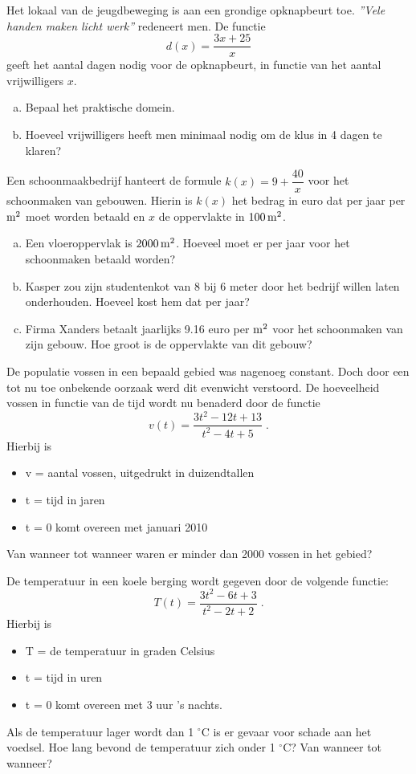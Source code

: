 \documentclass[a4paper,12pt]{article}
\begin{document}
\begin{oefening}
Het lokaal van de jeugdbeweging is aan een grondige opknapbeurt toe. {\em ''Vele handen maken licht werk''} redeneert men. De functie
$$d(x)=\dfrac{3x+25}{x}$$
geeft het aantal dagen nodig voor de opknapbeurt, in functie van het aantal vrijwilligers $x$.
\begin{enumerate}[(a)]
  \item Bepaal het praktische domein.
  \item Hoeveel vrijwilligers heeft men minimaal nodig om de klus in 4 dagen te klaren?
\end{enumerate}
\end{oefening}

\begin{oefening}
Een schoonmaakbedrijf hanteert de formule $k(x)=9+\dfrac{40}{x}$ voor het schoonmaken van gebouwen. Hierin is $k(x)$ het bedrag in euro dat per jaar per $\m^2$ moet worden betaald en $x$ de oppervlakte in $100 \m^2$.
\begin{enumerate}[(a)]
  \item Een vloeroppervlak is $2000 \m^2$. Hoeveel moet er per jaar voor het schoonmaken betaald worden?
  \item Kasper zou zijn studentenkot van 8 bij 6 meter door het bedrijf willen laten onderhouden. Hoeveel kost hem dat per jaar?
  \item Firma Xanders betaalt jaarlijks 9.16 euro per $\m^2$ voor het schoonmaken van zijn gebouw. Hoe groot is de oppervlakte van dit gebouw?
\end{enumerate}
\end{oefening}

\begin{oefening}
De populatie vossen in een bepaald gebied was nagenoeg constant. Doch door een tot nu toe onbekende oorzaak werd dit evenwicht verstoord. De hoeveelheid vossen in functie van de tijd wordt nu benaderd door de functie
$$v(t)=\dfrac{3t^2-12t+13}{t^2-4t+5}\;.$$
Hierbij is
\begin{itemize}
  \item v = aantal vossen, uitgedrukt in duizendtallen
  \item t = tijd in jaren
  \item t = 0 komt overeen met januari 2010
\end{itemize}
Van wanneer tot wanneer waren er minder dan 2000 vossen in het gebied?
\end{oefening}

\begin{oefening}
De temperatuur in een koele berging wordt gegeven door de volgende functie:
$$T(t)=\dfrac{3t^2-6t+3}{t^2-2t+2}\;.$$
Hierbij is
\begin{itemize}
  \item T = de temperatuur in graden Celsius
  \item t = tijd in uren
  \item t = 0 komt overeen met 3 uur 's nachts.
\end{itemize}
Als de temperatuur lager wordt dan 1 $^\circ$C is er gevaar voor schade aan het voedsel. Hoe lang bevond de temperatuur zich onder 1 $^\circ$C? Van wanneer tot wanneer?
\end{oefening}
\end{document}
